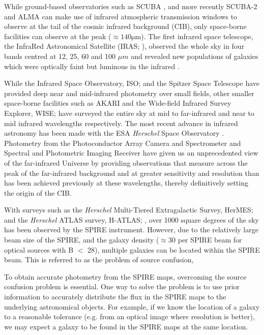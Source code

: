 \documentclass[useAMS,usenatbib]{mnras}
\begin{document}
While ground-based observatories such as SCUBA \citep{SCUBA}, and more recently SCUBA-2 \citep{SCUBA2} and ALMA can make use of infrared atmospheric transmission windows to observe at the tail of the cosmic infrared background (CIB), only space-borne facilities can observe at the peak ($\approx140\mathrm{\mu m}$). The first infrared space telescope, the InfraRed Astronomical Satellite (IRAS; \cite{Neugebauer:1984}), observed the whole sky in four bands centred at 12, 25, 60 and 100 $\mu m$ and revealed new populations of galaxies which were optically faint but luminous in the infrared \citep{Soifer:1984}.

While the Infrared Space Observatory, ISO; \cite{Kessler:1996} and the Spitzer Space Telescope \citep{Werner:2004} have provided deep near and mid-infrared photometry over small fields, other smaller space-borne facilities such as AKARI \citep{Murakami:2007} and the Wide-field Infrared Survey Explorer, WISE; \cite{Wright:2010} have surveyed the entire sky at mid to far-infrared and near to mid infrared wavelengths respectively. The most recent advance in infrared astronomy has been made with the ESA \emph{Herschel} Space Observatory \citep{Pilbratt:2010}. Photometry from the Photoconductor Array Camera and Spectrometer \citep[PACS;][]{Poglitsch:2010} and Spectral and Photometric Imaging Receiver \citep[SPIRE;][]{Griffin:2010} have given us an unprecedented view of the far-infrared Universe by providing observations that measure across the peak of the far-infrared background and at greater sensitivity and resolution than has been achieved previously at these wavelengths, thereby definitively setting the origin of the CIB.

With surveys such as the \emph{Herschel} Multi-Tiered Extragalactic Survey, HerMES; \cite{Oliver:2012} and the \emph{Herschel} ATLAS survey, H-ATLAS; \cite{Eales:2010}, over 1000 square degrees of the sky has been observed by the SPIRE instrument. However, due to the relatively large beam size of the SPIRE, and the galaxy density ($\approx 30$ per SPIRE beam for optical sources with B $<$ 28), multiple galaxies can be located within the SPIRE beam. This is referred to as the problem of source confusion, 

To obtain accurate photometry from the SPIRE maps, overcoming the source confusion problem is essential. One way to solve the problem is to use prior information to accurately distribute the flux in the SPIRE maps to the underlying astronomical objects. For example, if we know the location of a galaxy to a reasonable tolerance (e.g. from an optical image where resolution is better), we may expect a galaxy to be found in the SPIRE maps at the same location.
\end{document}
